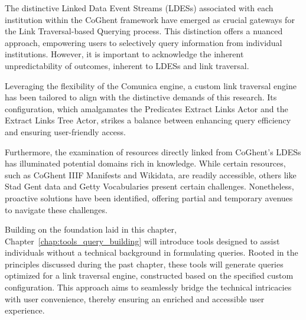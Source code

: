 The distinctive Linked Data Event Streams (LDESs) associated with each institution within the CoGhent framework have emerged as crucial gateways for the Link Traversal-based Querying process. This distinction offers a nuanced approach, empowering users to selectively query information from individual institutions. However, it is important to acknowledge the inherent unpredictability of outcomes, inherent to LDESs and link traversal.

Leveraging the flexibility of the Comunica engine, a custom link traversal engine has been tailored to align with the distinctive demands of this research. Its configuration, which amalgamates the Predicates Extract Links Actor and the Extract Links Tree Actor, strikes a balance between enhancing query efficiency and ensuring user-friendly access.

Furthermore, the examination of resources directly linked from CoGhent's LDESs has illuminated potential domains rich in knowledge. While certain resources, such as CoGhent IIIF Manifests and Wikidata, are readily accessible, others like Stad Gent data and Getty Vocabularies present certain challenges. Nonetheless, proactive solutions have been identified, offering partial and temporary avenues to navigate these challenges.

Building on the foundation laid in this chapter, Chapter~\ref{chap:tools_query_building} will introduce tools designed to assist individuals without a technical background in formulating queries. Rooted in the principles discussed during the past chapter, these tools will generate queries optimized for a link traversal engine, constructed based on the specified custom configuration. This approach aims to seamlessly bridge the technical intricacies with user convenience, thereby ensuring an enriched and accessible user experience.